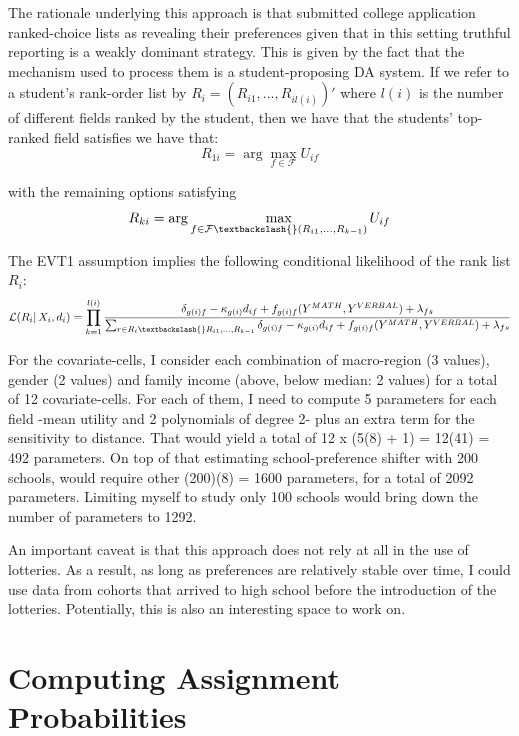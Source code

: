 \documentclass[a4paper, article, english, oneside, unknownkeysallowed, 12pt]{memoir}
\begin{document}
The rationale underlying this approach is that submitted college application ranked-choice lists as revealing their preferences given that in this setting truthful reporting is a weakly dominant strategy. This is given by the fact that the mechanism used to process them is a student-proposing DA system.
If we refer to a student's rank-order list by $R_i = (R_{i1}, ..., R_{il(i)})'$ where $l(i)$ is the number of different fields ranked by the student, 
then we have that the students' top-ranked field satisfies we have that:
\[R_{1i} = \arg \max_{f \in \mathcal{F}} U_{if} \] 

with the remaining options satisfying 
\[R_{ki} = \arg \max_{f \in \mathcal{F}  \textbackslash{} (R_{i1}, ..., R_{k-1}) } U_{if} \] 

The EVT1 assumption implies the following conditional likelihood of the rank list $R_i$: 
\begin{equation}
  \mathcal{L}(R_i | \, X_i, d_i) = \prod_{k=1}^{l(i)} \frac{\delta_{g(i)f} - \kappa_{g(i)} d_{if} + f_{g(i)f}(Y^{MATH}, Y^{VERBAL}) + \lambda_{fs}}{\sum_{r \in R_i \textbackslash{} R_{i1}, ..., R_{k-1}} \delta_{g(i)f} - \kappa_{g(i)} d_{if} + f_{g(i)f}(Y^{MATH}, Y^{VERBAL}) + \lambda_{fs} }
\end{equation}


For the covariate-cells, I consider each combination of macro-region (3 values), gender (2 values) and family income (above, below median: 2 values) for a total of 12 covariate-cells. For each of them, I need to compute 5 parameters for each field -mean utility and 2 polynomials of degree 2- plus an extra term for the sensitivity to distance. 
That would yield a total of 12 x (5(8) + 1) = 12(41) = 492 parameters. On top of that estimating school-preference shifter with 200 schools, would require other (200)(8) = 1600 parameters, for a total of 2092 parameters.
Limiting myself to study only 100 schools would bring down the number of parameters to 1292.

An important caveat is that this approach does not rely at all in the use of lotteries. As a result, as long as preferences are relatively stable over time, I could use data from cohorts that arrived to high school before the introduction of the lotteries. Potentially, this is also an interesting space to work on. 

\section{Computing Assignment Probabilities} 
\end{document}
